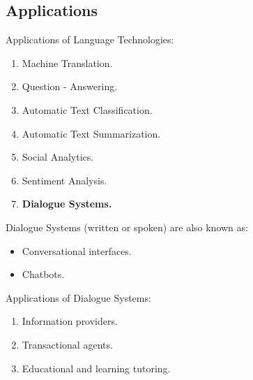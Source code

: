 \documentclass[11pt]{beamer}
\begin{document}
\subsection{Applications}

\begin{frame}
	\begin{block}{Applications of Language Technologies:}
		\begin{enumerate}
			\vspace{5pt}
			\item Machine Translation.
			\pause
			\item Question - Answering.
			\pause
			\item Automatic Text Classification.
			\pause
			\item Automatic Text Summarization.
			\pause
			\item Social Analytics.
			\pause
			\item Sentiment Analysis.
			\pause
			\item \textbf{Dialogue Systems.}
			\vspace{5pt}
		\end{enumerate}
	\end{block}
\end{frame}

\begin{frame}
	Dialogue Systems (written or spoken) are also known as:
	\begin{itemize}
		\item Conversational interfaces.
		\item Chatbots.
	\end{itemize}
	\vspace{20pt}
	\begin{block}{Applications of Dialogue Systems:}
		\begin{enumerate}
			\vspace{5pt}
			\pause
			\item Information providers.
			\pause
			\item Transactional agents.
			\pause
			\item Educational and learning tutoring.
			\vspace{5pt}
		\end{enumerate}
	\end{block}
\end{frame}
\end{document}
